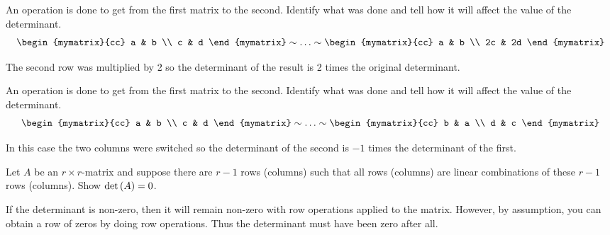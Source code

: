 \begin{enumialphparenastyle}
\begin{ex} An operation is done to get from the first matrix to the second.
Identify what was done and tell how it will affect the value of the
determinant. 
\begin{equation*}
\begin{mymatrix}{cc}
a & b \\
c & d
\end{mymatrix} \sim \ldots \sim \begin{mymatrix}{cc}
a & b \\
2c & 2d
\end{mymatrix}
\end{equation*}
\begin{sol}
The second row was multiplied by 2 so the determinant of the result is 2
times the original determinant.
\end{sol}
\end{ex}

\begin{ex} An operation is done to get from the first matrix to the second.
Identify what was done and tell how it will affect the value of the
determinant. 
\begin{equation*}
\begin{mymatrix}{cc}
a & b \\
c & d
\end{mymatrix} \sim \ldots \sim \begin{mymatrix}{cc}
b & a \\
d & c
\end{mymatrix}
\end{equation*}
\begin{sol}
In this case the two columns were switched so the determinant of the second
is $-1$ times the determinant of the first.
\end{sol}
\end{ex}


\begin{ex} Let $A$ be an $r\times r$-matrix and suppose there are $r-1$ rows
(columns) such that all rows (columns) are linear combinations of these $r-1$
rows (columns). Show $\det \left(A\right) =0$. 
\begin{sol}
If the determinant is non-zero, then it will remain non-zero with row operations applied to the matrix.
However, by assumption, you can obtain a row of zeros by doing row
operations. Thus the determinant must have been zero after all.
\end{sol}
\end{ex}


\end{enumialphparenastyle}
